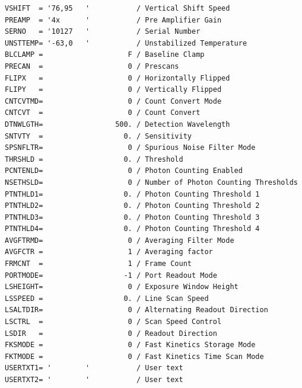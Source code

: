 \documentclass[
  letterpaper,
  DIV=11,
  numbers=noendperiod]{scrreprt}
\begin{document}
\begin{verbatim}
VSHIFT  = '76,95   '           / Vertical Shift Speed                           
PREAMP  = '4x      '           / Pre Amplifier Gain                             
SERNO   = '10127   '           / Serial Number                                  
UNSTTEMP= '-63,0   '           / Unstabilized Temperature                       
BLCLAMP =                    F / Baseline Clamp                                 
PRECAN  =                    0 / Prescans                                       
FLIPX   =                    0 / Horizontally Flipped                           
FLIPY   =                    0 / Vertically Flipped                             
CNTCVTMD=                    0 / Count Convert Mode                             
CNTCVT  =                    0 / Count Convert                                  
DTNWLGTH=                 500. / Detection Wavelength                           
SNTVTY  =                   0. / Sensitivity                                    
SPSNFLTR=                    0 / Spurious Noise Filter Mode                     
THRSHLD =                   0. / Threshold                                      
PCNTENLD=                    0 / Photon Counting Enabled                        
NSETHSLD=                    0 / Number of Photon Counting Thresholds           
PTNTHLD1=                   0. / Photon Counting Threshold 1                    
PTNTHLD2=                   0. / Photon Counting Threshold 2                    
PTNTHLD3=                   0. / Photon Counting Threshold 3                    
PTNTHLD4=                   0. / Photon Counting Threshold 4                    
AVGFTRMD=                    0 / Averaging Filter Mode                          
AVGFCTR =                    1 / Averaging factor                               
FRMCNT  =                    1 / Frame Count                                    
PORTMODE=                   -1 / Port Readout Mode                              
LSHEIGHT=                    0 / Exposure Window Height                         
LSSPEED =                   0. / Line Scan Speed                                
LSALTDIR=                    0 / Alternating Readout Direction                  
LSCTRL  =                    0 / Scan Speed Control                             
LSDIR   =                    0 / Readout Direction                              
FKSMODE =                    0 / Fast Kinetics Storage Mode                     
FKTMODE =                    0 / Fast Kinetics Time Scan Mode                   
USERTXT1= '        '           / User text                                      
USERTXT2= '        '           / User text                                      

\end{verbatim}
\end{document}
